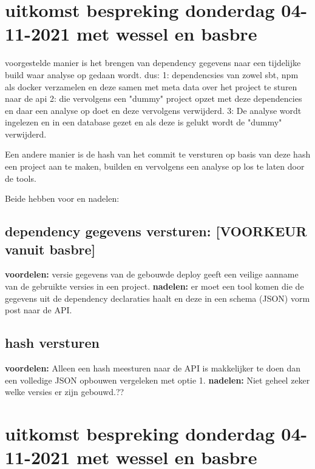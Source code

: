 \section{uitkomst bespreking donderdag 04-11-2021 met wessel en basbre}\label{sec:uitkomst-bespreking-donderdag-04-11-2021-met-wessel-en-basbre}

voorgestelde manier is het brengen van dependency gegevens naar een tijdelijke build waar analyse op gedaan wordt. dus: 1: dependencsies van zowel sbt, npm als docker verzamelen en deze samen met meta data over het project te sturen naar de api  2: die vervolgens een "dummy" project opzet met deze dependencies en daar een analyse op doet en deze vervolgens verwijderd. 3: De analyse wordt ingelezen en in een database gezet en als deze is gelukt wordt de "dummy" verwijderd.

Een andere manier is de hash van het commit te versturen op basis van deze hash een project aan te maken, builden en vervolgens een analyse op los te laten door de tools.

Beide hebben voor en nadelen:

\subsection{dependency gegevens versturen: [VOORKEUR vanuit basbre]}\label{subsec:dependency-gegevens-versturen:-[voorkeur-vanuit-basbre]}
\textbf{voordelen:}
versie gegevens van de gebouwde deploy geeft een veilige aanname van de gebruikte versies in een project.
\textbf{nadelen:}
er moet een tool komen die de gegevens uit de dependency declaraties haalt en deze in een schema (JSON) vorm post naar de API\@.

\subsection{hash versturen}\label{subsec:hash-versturen}
\textbf{voordelen:}
Alleen een hash meesturen naar de API is makkelijker te doen dan een volledige JSON opbouwen vergeleken met optie 1.
\textbf{nadelen:}
Niet geheel zeker welke versies er zijn gebouwd.??





\section{uitkomst bespreking donderdag 04-11-2021 met wessel en basbre}\label{sec:uitkomst-bespreking-donderdag-04-11-2021-met-wessel-en-basbre}

